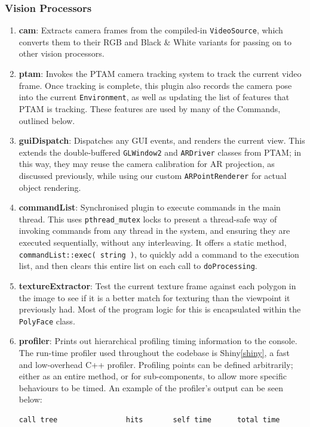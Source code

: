 \documentclass[a4paper,10pt]{article}
\begin{document}
\subsubsection{Vision Processors}
\begin{enumerate}
\item{\textbf{cam}: Extracts camera frames from the compiled-in \texttt{VideoSource}, which converts them to their RGB and Black \& White variants for passing on to other vision processors.}
\item{\textbf{ptam}: Invokes the PTAM camera tracking system to track the current video frame. Once tracking is complete, this plugin also records the camera pose into the current \texttt{Environment}, as well as updating the list of features that PTAM is tracking. These features are used by many of the Commands, outlined below.}
\item{\textbf{guiDispatch}: Dispatches any GUI events, and renders the current view. This extends the double-buffered \texttt{GLWindow2} and \texttt{ARDriver} classes from PTAM; in this way, they may reuse the camera calibration for AR projection, as discussed previously, while using our custom \texttt{ARPointRenderer} for actual object rendering.}
\item{\textbf{commandList}: Synchronised plugin to execute commands in the main thread. This uses \texttt{pthread\_mutex} locks to present a thread-safe way of invoking commands from any thread in the system, and ensuring they are executed sequentially, without any interleaving. It offers a static method, \texttt{commandList::exec( string )}, to quickly add a command to the execution list, and then clears this entire list on each call to \texttt{doProcessing}.}
\item{\textbf{textureExtractor}: Test the current texture frame against each polygon in the image to see if it is a better match for texturing than the viewpoint it previously had. Most of the program logic for this is encapsulated within the \texttt{PolyFace} class.}
\item{\textbf{profiler}: Prints out hierarchical profiling timing information to the console. The run-time profiler used throughout the codebase is Shiny\ref{shiny}, a fast and low-overhead C++ profiler. Profiling points can be defined arbitrarily; either as an entire method, or for sub-components, to allow more specific behaviours to be timed. An example of the profiler's output can be seen below:
\begin{verbatim}
call tree                hits       self time      total time

\end{verbatim}}
\end{enumerate}
\end{document}
